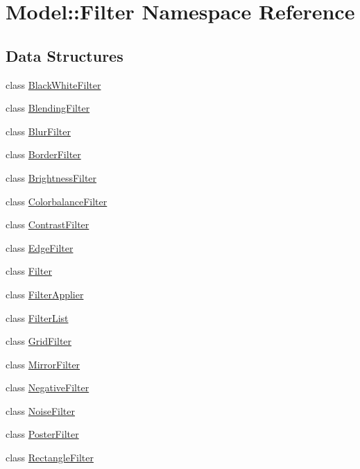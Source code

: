 \hypertarget{namespaceModel_1_1Filter}{}\section{Model\+:\+:Filter Namespace Reference}
\label{namespaceModel_1_1Filter}
\subsection*{Data Structures}
\begin{DoxyCompactItemize}
\item 
class \hyperlink{classModel_1_1Filter_1_1BlackWhiteFilter}{Black\+White\+Filter}
\item 
class \hyperlink{classModel_1_1Filter_1_1BlendingFilter}{Blending\+Filter}
\item 
class \hyperlink{classModel_1_1Filter_1_1BlurFilter}{Blur\+Filter}
\item 
class \hyperlink{classModel_1_1Filter_1_1BorderFilter}{Border\+Filter}
\item 
class \hyperlink{classModel_1_1Filter_1_1BrightnessFilter}{Brightness\+Filter}
\item 
class \hyperlink{classModel_1_1Filter_1_1ColorbalanceFilter}{Colorbalance\+Filter}
\item 
class \hyperlink{classModel_1_1Filter_1_1ContrastFilter}{Contrast\+Filter}
\item 
class \hyperlink{classModel_1_1Filter_1_1EdgeFilter}{Edge\+Filter}
\item 
class \hyperlink{classModel_1_1Filter_1_1Filter}{Filter}
\item 
class \hyperlink{classModel_1_1Filter_1_1FilterApplier}{Filter\+Applier}
\item 
class \hyperlink{classModel_1_1Filter_1_1FilterList}{Filter\+List}
\item 
class \hyperlink{classModel_1_1Filter_1_1GridFilter}{Grid\+Filter}
\item 
class \hyperlink{classModel_1_1Filter_1_1MirrorFilter}{Mirror\+Filter}
\item 
class \hyperlink{classModel_1_1Filter_1_1NegativeFilter}{Negative\+Filter}
\item 
class \hyperlink{classModel_1_1Filter_1_1NoiseFilter}{Noise\+Filter}
\item 
class \hyperlink{classModel_1_1Filter_1_1PosterFilter}{Poster\+Filter}
\item 
class \hyperlink{classModel_1_1Filter_1_1RectangleFilter}{Rectangle\+Filter}

\end{DoxyCompactItemize}
